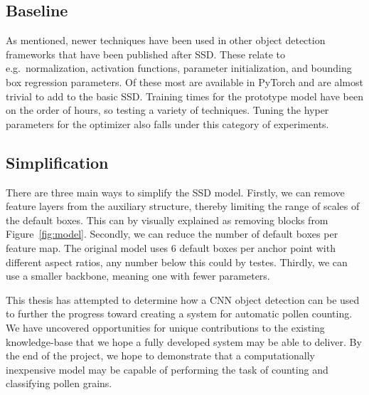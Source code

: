 \subsection*{Baseline}
As mentioned, newer techniques have been used in other object detection frameworks that have been published after SSD\@.
These relate to e.g.\ normalization, activation functions, parameter initialization, and bounding box regression parameters.
Of these most are available in PyTorch and are almost trivial to add to the basic SSD\@.
Training times for the prototype model have been on the order of hours, so testing a variety of techniques.
Tuning the hyper parameters for the optimizer also falls under this category of experiments.

\subsection*{Simplification}
There are three main ways to simplify the SSD model.
Firstly, we can remove feature layers from the auxiliary structure, thereby limiting the range of scales of the default boxes.
This can by visually explained as removing blocks from Figure~\ref{fig:model}.
Secondly, we can reduce the number of default boxes per feature map.
The original model uses 6 default boxes per anchor point with different aspect ratios, any number below this could by testes.
Thirdly, we can use a smaller backbone, meaning one with fewer parameters.

This thesis has attempted to determine how a CNN object detection can be used to further the progress toward creating a system for automatic pollen counting.
We have uncovered opportunities for unique contributions to the existing knowledge-base that we hope a fully developed system may be able to deliver.
By the end of the project, we hope to demonstrate that a computationally inexpensive model may be capable of performing the task of counting and classifying pollen grains.
